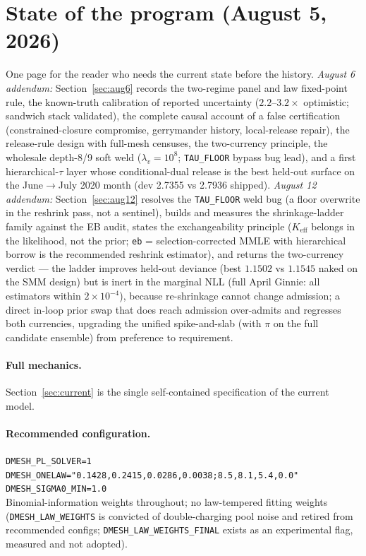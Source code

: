 \documentclass[11pt]{article}
\begin{document}
\section*{State of the program (August 5, 2026)}
One page for the reader who needs the current state before the history.
\emph{August 6 addendum:} Section~\ref{sec:aug6} records the two-regime panel and
law fixed-point rule, the known-truth calibration of reported uncertainty
($2.2$--$3.2\times$ optimistic; sandwich stack validated), the complete causal
account of a false certification (constrained-closure compromise, gerrymander
history, local-release repair), the release-rule design with full-mesh censuses,
the two-currency principle, the wholesale depth-8/9 soft weld
($\lambda_v=10^8$; \texttt{TAU\_FLOOR} bypass bug lead), and a first
hierarchical-$\tau$ layer whose conditional-dual release is the best held-out
surface on the June$\to$July 2020 month (dev 2.7355 vs 2.7936 shipped).
\emph{August 12 addendum:} Section~\ref{sec:aug12} resolves the
\texttt{TAU\_FLOOR} weld bug (a floor overwrite in the reshrink pass, not a
sentinel), builds and measures the shrinkage-ladder family against the EB
audit, states the exchangeability principle ($K_{\mathrm{eff}}$ belongs in the
likelihood, not the prior; \texttt{eb} = selection-corrected MMLE with
hierarchical borrow is the recommended reshrink estimator), and returns the
two-currency verdict --- the ladder improves held-out deviance (best
$1.1502$ vs $1.1545$ naked on the SMM design) but is inert in the marginal
NLL (full April Ginnie: all estimators within $2\times10^{-4}$), because
re-shrinkage cannot change admission; a direct in-loop prior swap that does
reach admission over-admits and regresses both currencies, upgrading the
unified spike-and-slab (with $\pi$ on the full candidate ensemble) from
preference to requirement.

\paragraph{Full mechanics.} Section~\ref{sec:current} is the single
self-contained specification of the current model.

\paragraph{Recommended configuration.}
\texttt{DMESH\_PL\_SOLVER=1}\quad
\texttt{DMESH\_ONELAW="0.1428,0.2415,0.0286,0.0038;8.5,8.1,5.4,0.0"}\quad
\texttt{DMESH\_SIGMA0\_MIN=1.0}\\
Binomial-information weights throughout; no law-tempered fitting weights
(\texttt{DMESH\_LAW\_WEIGHTS} is convicted of double-charging pool noise and
retired from recommended configs; \texttt{DMESH\_LAW\_WEIGHTS\_FINAL} exists
as an experimental flag, measured and not adopted).
\end{document}
